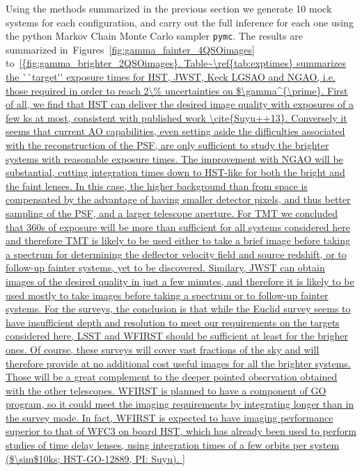\documentclass[a4paper,11pt]{article}
\begin{document}
Using the methods summarized in the previous section we generate 10
mock systems for each configuration, and carry out the full inference
for each one using the python Markov Chain Monte Carlo sampler
\texttt{pymc}.  The results are summarized 
in~Figures~\ref{fig:gamma_fainter_4QSOimages}
to~\ref{{fig:gamma_brighter_2QSOimages}. Table~\ref{tab:exptimes}
summarizes the ``target'' exposure times for HST, JWST, Keck LGSAO and
NGAO, i.e. those required in order to reach 2\% uncertainties on
$\gamma^{\prime}. 

First of all, we find that HST can deliver the desired image quality
with exposures of a few ks at most, consistent with published work
\cite{Suyu++13}. Conversely it seems that current AO capabilities, even
setting aside the difficulties associated with the reconstruction of
the PSF, are only sufficient to study the brighter systems with
reasonable exposure times. The improvement with NGAO will be
substantial, cutting integration times down to HST-like for both the
bright and the faint lenses. In this case, the higher background than
from space is compensated by the advantage of having smaller detector
pixels, and thus better sampling of the PSF, and a larger telescope
aperture.

For TMT we concluded that 360s of exposure will be more than
sufficient for all systems considered here and therefore TMT is likely
to be used either to take a brief image before taking a spectrum for
determining the deflector velocity field and source redshift, or to
follow-up fainter systems, yet to be discovered. Similary, JWST can
obtain images of the desired quality in just a few minutes, and
therefore it is likely to be used mostly to take images before taking
a spectrum or to follow-up fainter systems.

For the surveys, the conclusion is that while the Euclid survey seems
to have insufficient depth and resolution to meet our requirements on
the targets considered here, LSST and WFIRST should be sufficient at
least for the brigher ones. Of course, these surveys will cover vast
fractions of the sky and will therefore provide at no additional cost
useful images for all the brighter systems. Those will be a great
complement to the deeper pointed observation obtained with the other
telescopes. WFIRST is planned to have a component of GO program, so it
could meet the imaging requirements by integrating longer than in the
survey mode. In fact, WFIRST is expected to have imaging performance
superior to that of WFC3 on board HST, which has already been used to
perform studies of time delay lenses, using integration times of a few
orbits per system ($\sim$10ks; HST-GO-12889, PI: Suyu).

}
\end{document}
